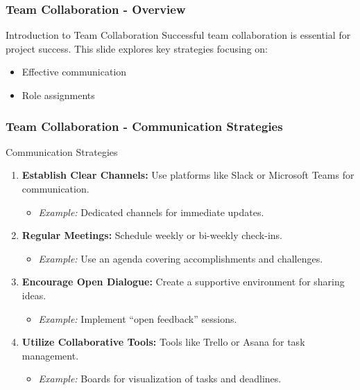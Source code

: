 \documentclass[aspectratio=169]{beamer}
\begin{document}
\begin{frame}[fragile]
    \frametitle{Team Collaboration - Overview}
    \begin{block}{Introduction to Team Collaboration}
        Successful team collaboration is essential for project success. 
        This slide explores key strategies focusing on:
        \begin{itemize}
            \item Effective communication
            \item Role assignments
        \end{itemize}
    \end{block}
\end{frame}

\begin{frame}[fragile]
    \frametitle{Team Collaboration - Communication Strategies}
    \begin{block}{Communication Strategies}
        \begin{enumerate}
            \item \textbf{Establish Clear Channels:} 
                Use platforms like Slack or Microsoft Teams for communication.
                \begin{itemize}
                    \item \textit{Example:} Dedicated channels for immediate updates.
                \end{itemize}
                
            \item \textbf{Regular Meetings:} 
                Schedule weekly or bi-weekly check-ins.
                \begin{itemize}
                    \item \textit{Example:} Use an agenda covering accomplishments and challenges.
                \end{itemize}

            \item \textbf{Encourage Open Dialogue:} 
                Create a supportive environment for sharing ideas.
                \begin{itemize}
                    \item \textit{Example:} Implement “open feedback” sessions.
                \end{itemize}

            \item \textbf{Utilize Collaborative Tools:} 
                Tools like Trello or Asana for task management.
                \begin{itemize}
                    \item \textit{Example:} Boards for visualization of tasks and deadlines.
                \end{itemize}
        \end{enumerate}
    \end{block}
\end{frame}
\end{document}
